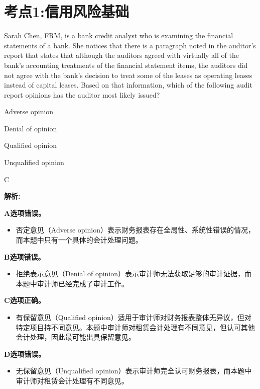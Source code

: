 \documentclass{article}
\newcounter{question} %
\newenvironment{explanation}
{\textbf{解析:}\par}
{\par}
\begin{document}
 \tableofcontents %
\newpage




\section{考点1:信用风险基础}
\setcounter{question}{0}


\begin{question}
    Sarah Chen, FRM, is a bank credit analyst who is examining the financial statements of a bank. She notices that there is a paragraph noted in the auditor's report that states that although the auditors agreed with virtually all of the bank's accounting treatments of the financial statement items, the auditors did not agree with the bank's decision to treat some of the leases as operating leases instead of capital leases. Based on that information, which of the following audit report opinions has the auditor most likely issued?
\end{question}

\begin{choices}
    \item Adverse opinion
    \item Denial of opinion
    \item Qualified opinion
    \item Unqualified opinion
\end{choices}

\begin{correctanswer}
    C
\end{correctanswer}

\begin{explanation}
    \textbf{A选项错误。}
    \begin{itemize}
        \item 否定意见（Adverse opinion）表示财务报表存在全局性、系统性错误的情况，而本题中只有一个具体的会计处理问题。
    \end{itemize}
    
    \textbf{B选项错误。}
    \begin{itemize}
        \item 拒绝表示意见（Denial of opinion）表示审计师无法获取足够的审计证据，而本题中审计师已经完成了审计工作。
    \end{itemize}
    
    \textbf{C选项正确。}
    \begin{itemize}
        \item 有保留意见（Qualified opinion）适用于审计师对财务报表整体无异议，但对特定项目持不同意见。本题中审计师对租赁会计处理有不同意见，但认可其他会计处理，因此最可能出具保留意见。
    \end{itemize}
    
    \textbf{D选项错误。}
    \begin{itemize}
        \item 无保留意见（Unqualified opinion）表示审计师完全认可财务报表，而本题中审计师对租赁会计处理有不同意见。
    \end{itemize}
\end{explanation}
\end{document}
